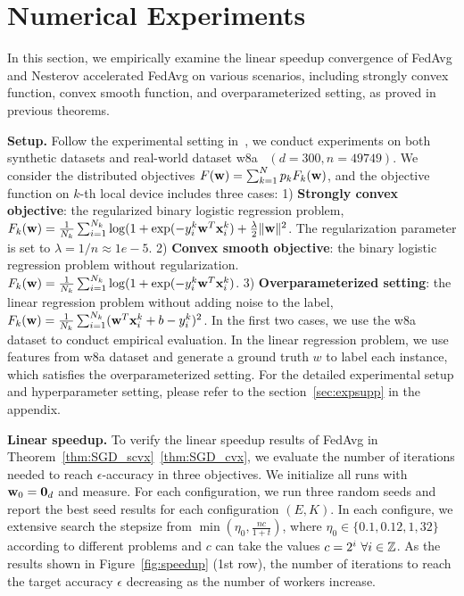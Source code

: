 


\section{Numerical Experiments}
\label{sec:exp}

In this section, we empirically examine the linear speedup convergence of FedAvg and Nesterov accelerated FedAvg on various scenarios, including strongly convex function, convex smooth function, and overparameterized setting, as proved in previous theorems.

\textbf{Setup.} Follow the experimental setting in~\cite{stich2018local}, we
conduct experiments on both synthetic datasets and real-world dataset
w8a~\cite{platt1998fast} $(d=300, n=49749)$. We consider the distributed
objectives $F({\mathbf{w}}) = \sum_{k=1}^N p_kF_k({\mathbf{w}})$, and the objective function on
$k$-th local device includes three cases: 1) \textbf{Strongly convex
objective}: the regularized binary logistic regression problem, $F_k({\mathbf{w}}) =
\frac{1}{N_k} \sum_{i=1}^{N_k} \log( 1+ \exp(-y_i^k {\mathbf{w}}^T{\mathbf{x}}_i^k) + \frac{\lambda}{2}
\|{\mathbf{w}}\|^2$. The regularization parameter is set to $\lambda = 1/n \approx
1e-5$. 2) \textbf{Convex smooth objective}: the binary logistic regression
problem without regularization. $F_k({\mathbf{w}}) = \frac{1}{N_k} \sum_{i=1}^{N_k}
\log( 1+ \exp(-y_i^k {\mathbf{w}}^T{\mathbf{x}}_i^k)$. 3) \textbf{Overparameterized setting}:
the linear regression problem without adding noise to the label, $F_k({\mathbf{w}}) =
\frac{1}{N_k} \sum_{i=1}^{N_k} ({\mathbf{w}}^T{\mathbf{x}}_i^k + b  - y_i^k)^2$.  In the first
two cases, we use the w8a dataset to conduct empirical evaluation. 
In the linear regression problem, we use features from w8a dataset and 
generate a ground truth $w$ to label each instance, which satisfies the
overparameterized setting. For the detailed experimental setup and
hyperparameter setting, please refer to the section~\ref{sec:expsupp} in the
appendix.


\textbf{Linear speedup.} To verify the linear speedup results of FedAvg in Theorem~\ref{thm:SGD_scvx}~\ref{thm:SGD_cvx}, we evaluate the number of iterations needed to reach
$\epsilon$-accuracy in three objectives. We initialize all runs with ${\mathbf{w}}_0 = \textbf{0}_d$ and measure. For each configuration, we run three random seeds and report
the best seed results for each configuration $(E, K)$. In each configure, we
extensive search the stepsize from $\min(\eta_0, \frac{nc}{1 + t})$, where
$\eta_0 \in \{0.1, 0.12, 1, 32 \}$ according to different problems and $c$ can
take the values $c = 2^i \ \forall i \in \mathbb{Z}$. As the results shown in Figure~\ref{fig:speedup} (1st row),
the number of iterations to reach the target accuracy $\epsilon$ decreasing 
as the number of workers increase. 

